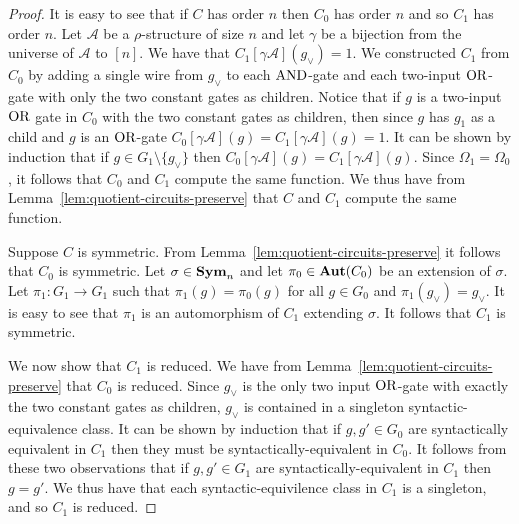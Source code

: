 \documentclass[../paper.tex]{subfiles}
\begin{document}
\begin{proof}


  
  It is easy to see that if $C$ has order $n$ then $C_0$ has order $n$ and so
  $C_1$ has order $n$. Let $\mathcal{A}$ be a $\rho$-structure of size $n$ and
  let $\gamma$ be a bijection from the universe of $\mathcal{A}$ to $[n]$. We
  have that $C_1[\gamma \mathcal{A}](g_\lor) = 1$. We constructed $C_1$ from
  $C_0$ by adding a single wire from $g_\lor$ to each $\text{\upshape AND}$-gate and each
  two-input $\text{\upshape OR}$-gate with only the two constant gates as children. Notice that
  if $g$ is a two-input $\text{\upshape OR}$ gate in $C_0$ with the two constant gates as
  children, then since $g$ has $g_1$ as a child and $g$ is an $\text{\upshape OR}$-gate
  $C_0[\gamma \mathcal{A}](g) = C_1[\gamma \mathcal{A}](g) = 1$. It can be shown
  by induction that if $g \in G_1 \setminus \{g_\lor\}$ then $C_0 [\gamma
  \mathcal{A}](g) = C_1[\gamma \mathcal{A}](g)$. Since $\Omega_1 = \Omega_0$, it
  follows that $C_0$ and $C_1$ compute the same function. We thus have from
  Lemma~\ref{lem:quotient-circuits-preserve} that $C$ and $C_1$ compute the same
  function.

  Suppose $C$ is symmetric. From Lemma~\ref{lem:quotient-circuits-preserve} it
  follows that $C_0$ is symmetric. Let $\sigma \in \text{\textbf{Sym}}_n$ and let $\pi_0 \in
  \text{\textbf{Aut}}(C_0)$ be an extension of $\sigma$. Let $\pi_1 : G_1 \rightarrow G_1$ such
  that $\pi_1 (g) = \pi_0(g)$ for all $g \in G_0$ and $\pi_1 (g_\lor) = g_\lor$.
  It is easy to see that $\pi_1$ is an automorphism of $C_1$ extending $\sigma$.
  It follows that $C_1$ is symmetric.

  We now show that $C_1$ is reduced. We have from
  Lemma~\ref{lem:quotient-circuits-preserve} that $C_0$ is reduced. Since
  $g_\lor$ is the only two input $\text{\upshape OR}$-gate with exactly the two constant gates
  as children, $g_\lor$ is contained in a singleton syntactic-equivalence class.
  It can be shown by induction that if $g, g' \in G_0$ are syntactically
  equivalent in $C_1$ then they must be syntactically-equivalent in $C_0$. It
  follows from these two observations that if $g, g' \in G_1$ are
  syntactically-equivalent in $C_1$ then $g = g'$. We thus have that each
  syntactic-equivilence class in $C_1$ is a singleton, and so $C_1$ is reduced.


\end{proof}
\end{document}
